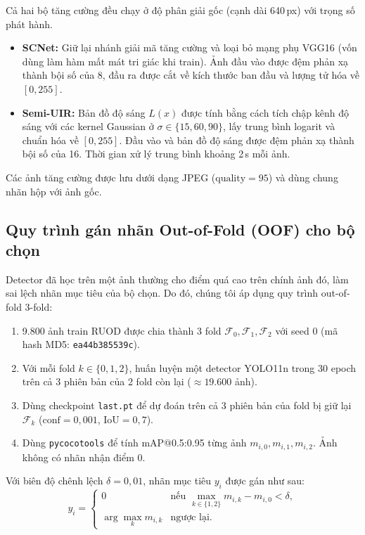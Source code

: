\documentclass[runningheads]{llncs}
\begin{document}
Cả hai bộ tăng cường đều chạy ở độ phân giải gốc (cạnh dài 640\,px) với trọng số phát hành.
\begin{itemize}
    \item \textbf{SCNet:} Giữ lại nhánh giải mã tăng cường và loại bỏ mạng phụ VGG16 (vốn dùng làm hàm mất mát tri giác khi train). Ảnh đầu vào được đệm phản xạ thành bội số của 8, đầu ra được cắt về kích thước ban đầu và lượng tử hóa về $[0, 255]$.
    \item \textbf{Semi-UIR:} Bản đồ độ sáng $L(x)$ được tính bằng cách tích chập kênh độ sáng với các kernel Gaussian ở $\sigma \in \{15, 60, 90\}$, lấy trung bình logarit và chuẩn hóa về $[0, 255]$. Đầu vào và bản đồ độ sáng được đệm phản xạ thành bội số của 16. Thời gian xử lý trung bình khoảng 2\,s mỗi ảnh.
\end{itemize}
Các ảnh tăng cường được lưu dưới dạng JPEG ($\text{quality} = 95$) và dùng chung nhãn hộp với ảnh gốc.

\subsection{Quy trình gán nhãn Out-of-Fold (OOF) cho bộ chọn}
\label{sec:method-labels}

Detector đã học trên một ảnh thường cho điểm quá cao trên chính ảnh đó, làm sai lệch nhãn mục tiêu của bộ chọn. Do đó, chúng tôi áp dụng quy trình out-of-fold 3-fold:
\begin{enumerate}
    \item 9.800 ảnh train RUOD được chia thành 3 fold $\mathcal{F}_0, \mathcal{F}_1, \mathcal{F}_2$ với seed 0 (mã hash MD5: \texttt{ea44b385539c}).
    \item Với mỗi fold $k \in \{0, 1, 2\}$, huấn luyện một detector YOLO11n trong 30 epoch trên cả 3 phiên bản của 2 fold còn lại ($\approx 19.600$ ảnh).
    \item Dùng checkpoint \texttt{last.pt} để dự đoán trên cả 3 phiên bản của fold bị giữ lại $\mathcal{F}_k$ ($\text{conf} = 0{,}001$, $\text{IoU} = 0{,}7$).
    \item Dùng \texttt{pycocotools} để tính mAP@0.5:0.95 từng ảnh $m_{i,0}, m_{i,1}, m_{i,2}$. Ảnh không có nhãn nhận điểm 0.
\end{enumerate}
Với biên độ chênh lệch $\delta = 0{,}01$, nhãn mục tiêu $y_i$ được gán như sau:
\begin{equation}
    y_i =
    \begin{cases}
        0                    & \text{nếu } \max_{k \in \{1, 2\}} m_{i,k} - m_{i,0} < \delta, \\
        \arg\max_{k} m_{i,k} & \text{ngược lại}.
    \end{cases}
\end{equation}
\end{document}
